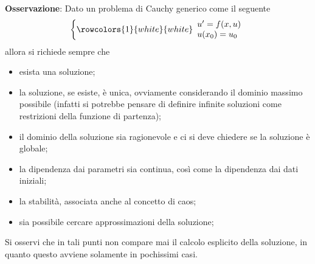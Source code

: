 \documentclass[a4paper]{extarticle}
\begin{document}
\vspace{2em}
\noindent
\textbf{Osservazione}: Dato un problema di Cauchy generico come il seguente
\[\left\{
    \rowcolors{1}{white}{white}
    \begin{array}{lll}
        u'=f(x,u)\\
        u(x_0)=u_0\\
    \end{array}
\right.\]
allora si richiede sempre che
\begin{itemize}
    \item esista una soluzione;
    \item la soluzione, se esiste, è unica, ovviamente considerando il dominio massimo possibile (infatti si potrebbe pensare di definire infinite soluzioni come restrizioni della funzione di partenza);
    \item il dominio della soluzione sia ragionevole e ci si deve chiedere se la soluzione è globale;
    \item la dipendenza dai parametri sia continua, così come la dipendenza dai dati iniziali;
    \item la stabilità, associata anche al concetto di caos;
    \item sia possibile cercare approssimazioni della soluzione; 
\end{itemize}
Si osservi che in tali punti non compare mai il calcolo esplicito della soluzione, in quanto questo avviene solamente in pochissimi casi.

\vspace{1em}
\end{document}
